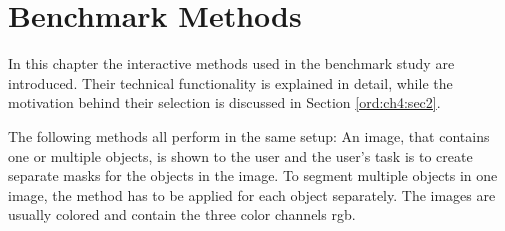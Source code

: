 
\chapter{Benchmark Methods}\label{ord:ch3}

In this chapter the interactive methods used in the benchmark study are introduced.
Their technical functionality is explained in detail, while the motivation behind their selection is discussed in Section \ref{ord:ch4:sec2}.

The following methods all perform in the same setup: An image, that contains one or multiple objects, is shown to the user and the user's task is to create separate masks for the objects in the image.
To segment multiple objects in one image, the method has to be applied for each object separately.
The images are usually colored and contain the three color channels \gls{rgb}.




